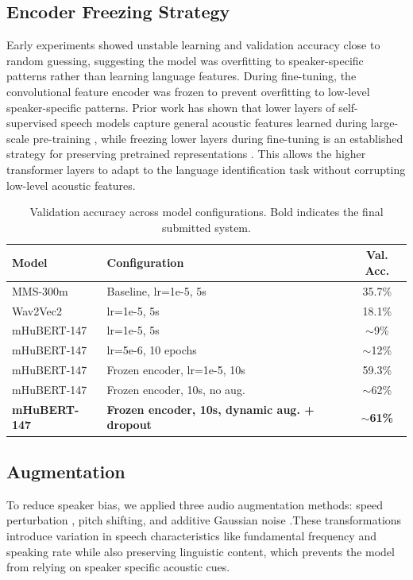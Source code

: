 \documentclass[11pt]{article}
\begin{document}
\subsection{Encoder Freezing Strategy}
Early experiments showed unstable learning and validation accuracy close  to random guessing, suggesting the model was overfitting to speaker-specific  patterns rather than learning language features. During fine-tuning, the convolutional feature encoder was frozen to prevent overfitting to low-level speaker-specific patterns. Prior work has shown that lower layers of 
self-supervised speech models capture general acoustic features learned  during large-scale pre-training \cite{pasad2021layerwise}, while freezing  lower layers during fine-tuning is an established strategy for preserving pretrained representations \cite{howard2018universallanguagemodelfinetuning}. This allows the higher transformer layers to adapt to the language identification task without  corrupting low-level acoustic features.
\begin{table}[t]
\centering
\small
\begin{tabular}{llc}
\hline
\textbf{Model} & \textbf{Configuration} & \textbf{Val. Acc.} \\
\hline
MMS-300m      & Baseline, lr=1e-5, 5s                              & 35.7\% \\
Wav2Vec2      & lr=1e-5, 5s                                        & 18.1\% \\
mHuBERT-147   & lr=1e-5, 5s                                        & $\sim$9\% \\
mHuBERT-147   & lr=5e-6, 10 epochs                                 & $\sim$12\% \\
mHuBERT-147      & Frozen encoder, lr=1e-5, 10s                            & 59.3\% \\
mHuBERT-147   & Frozen encoder, 10s, no aug.                   & $\sim$62\% \\
\textbf{mHuBERT-147} & \textbf{Frozen encoder, 10s, dynamic aug. + dropout} & \textbf{$\sim$61\%} \\
\hline
\end{tabular}
\caption{Validation accuracy across model configurations. Bold indicates the final submitted system.}
\label{tab:results}
\end{table}

\subsection{Augmentation}
To reduce speaker bias, we applied three audio augmentation methods: 
speed perturbation \cite{Park_2019}, pitch shifting, and additive Gaussian 
noise \cite{seltzer2013noise}.These transformations introduce variation in 
speech characteristics like fundamental frequency and speaking rate while also 
preserving linguistic content, which prevents the model from relying on speaker specific acoustic cues.
\end{document}
